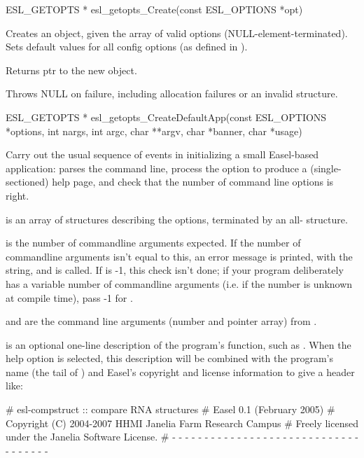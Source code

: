 \begin{sreapi}
\hypertarget{func:esl_getopts_Create()}
{\item[ESL\_GETOPTS * esl\_getopts\_Create(const ESL\_OPTIONS *opt)]}

Creates an  object, given the
array of valid options  (NULL-element-terminated).
Sets default values for all config 
options (as defined in ).

Returns ptr to the new  object.

Throws NULL on failure, including allocation failures or
an invalid  structure.


\hypertarget{func:esl_getopts_CreateDefaultApp()}
{\item[ESL\_GETOPTS * esl\_getopts\_CreateDefaultApp(const ESL\_OPTIONS *options, int nargs, int argc, char **argv, char *banner, char *usage)]}

Carry out the usual sequence of events in initializing a
small Easel-based application: parses the command line,
process the  option to produce a (single-sectioned)
help page, and check that the number of command line
options is right.

 is an array of  structures describing
the options, terminated by an all- structure.

 is the number of commandline arguments
expected. If the number of commandline arguments isn't
equal to this, an error message is printed, with the
 string, and  is called. If  is
-1, this check isn't done; if your program deliberately
has a variable number of commandline arguments (i.e.
if the number is unknown at compile time), pass -1
for .

 and  are the command line
arguments (number and pointer array) from .

 is an optional one-line description of the
program's function, such as .
When the  help option is selected, this description
will be combined with the program's name (the tail of
) and Easel's copyright and license information
to give a header like:

\begin{cchunk}
# esl-compstruct :: compare RNA structures
# Easel 0.1 (February 2005)
# Copyright (C) 2004-2007 HHMI Janelia Farm Research Campus
# Freely licensed under the Janelia Software License.
# - - - - - - - - - - - - - - - - - - - - - - - - - - - - - - - - - - - -
\end{cchunk}


\end{sreapi}
